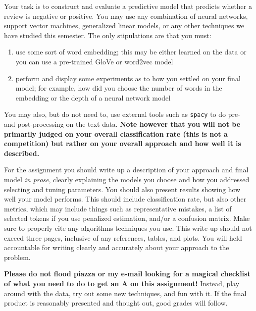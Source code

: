 \documentclass[12pt]{article}
\begin{document}
Your task is to construct and evaluate a predictive model that predicts whether
a review is negative or positive. You may use any combination of neural networks,
support vector machines, generalized linear models, or any other techniques we
have studied this semester. The only stipulations are that you must:
\begin{enumerate}
\item use some sort of word embedding; this may be either learned on the data or
you can use a pre-trained GloVe or word2vec model
\item perform and display some experiments as to how you settled on your final
model; for example, how did you choose the number of words in the embedding or
the depth of a neural network model
\end{enumerate}
You may also, but do not need to, use external tools such as \texttt{spacy} to
do pre- and post-processing on the text data. \textbf{Note however that you
will not be primarily judged on your overall classification rate (this is not
a competition) but rather on your overall approach and how well it is described.}

For the assignment you should write up a description of your approach and final
model \textit{in prose}, clearly explaining the models you choose and how you
addressed selecting and tuning parameters. You should also present results
showing how well your model performs. This should include classification rate,
but also other metrics, which may include things such as representative mistakes,
a list of selected tokens if you use penalized estimation, and/or a confusion
matrix. Make sure to properly cite any algorithms techniques you use. This write-up
should not exceed three pages, inclusive of any references, tables, and plots.
You will held accountable for writing clearly and accurately about your approach
to the problem.

\textbf{Please do not flood piazza or my e-mail looking for a magical checklist
of what you need to do to get an A on this assignment!} Instead, play around with
the data, try out some new techniques, and fun with it. If the final product is
reasonably presented and thought out, good grades will follow.
\end{document}
